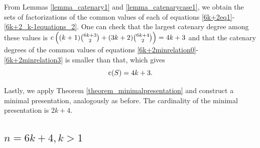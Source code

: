 \documentclass[12pt]{article}
\theoremstyle{remark}
\begin{document}
From Lemmas \ref{lemma_catenary1} and \ref{lemma_catenarycase1}, we obtain the sets of factorizations of the common values of each of equations \eqref{6k+2eq1}-\eqref{6k+2_k-1equations_2}.
One can check that the largest catenary degree among these values is $\textup{c} \left((k+1) \binom{6k+3}{2} + (3k+2) \binom{6k+4}{2} \right) = 4k+3$ and that the catenary degrees of the common values of equations \eqref{6k+2minrelation0}-\eqref{6k+2minrelation3} is smaller than that, which gives
$$ \textup{c}(S) = 4k+3.$$

Lastly, we apply Theorem \ref{theorem_minimalpresentation} and construct a minimal presentation, analogously as before. The cardinality of the minimal presentation is $2k+4$.


\subsection{$n = 6k+4, k>1$}
\end{document}
